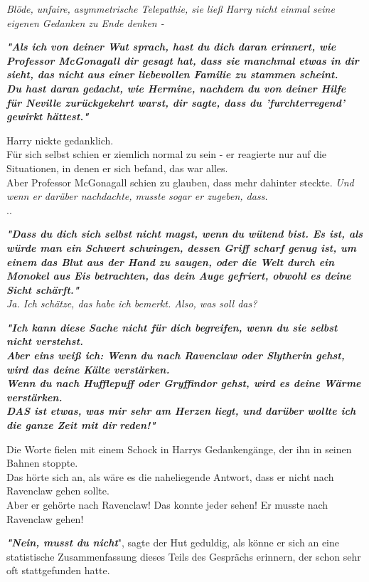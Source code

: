 {\emph{Blöde, unfaire, asymmetrische Telepathie, sie ließ Harry nicht einmal seine eigenen Gedanken zu Ende denken -}

\textbf{\emph{"Als ich von deiner Wut sprach, hast du dich daran erinnert, wie Professor McGonagall dir gesagt hat, dass sie manchmal etwas in dir sieht, das nicht aus einer liebevollen Familie zu stammen scheint.\\ Du hast daran gedacht, wie Hermine, nachdem du von deiner Hilfe für Neville zurückgekehrt warst, dir sagte, dass du 'furchterregend' gewirkt hättest."}}

Harry nickte gedanklich.\\ Für sich selbst schien er ziemlich normal zu sein - er reagierte nur auf die Situationen, in denen er sich befand, das war alles.\\ Aber Professor McGonagall schien zu glauben, dass mehr dahinter steckte. \emph{Und wenn er darüber nachdachte, musste sogar er zugeben, dass.}\\ ..

\textbf{\emph{"Dass du dich sich selbst nicht magst, wenn du wütend bist. Es ist, als würde man ein Schwert schwingen, dessen Griff scharf genug ist, um einem das Blut aus der Hand zu saugen, oder die Welt durch ein Monokel aus Eis betrachten, das dein Auge gefriert, obwohl es deine Sicht schärft."}}\\ \emph{\hfill\break Ja. Ich schätze, das habe ich bemerkt. Also, was soll das?}

\textbf{\emph{"Ich kann diese Sache nicht für dich begreifen, wenn du sie selbst nicht verstehst.\\ Aber eins weiß ich: Wenn du nach Ravenclaw oder Slytherin gehst, wird das deine Kälte verstärken.}}\\ \textbf{\emph{Wenn du nach Hufflepuff oder Gryffindor gehst, wird es deine Wärme verstärken.\\ DAS ist etwas, was mir sehr am Herzen liegt, und darüber wollte ich die ganze Zeit mit dir}} \textbf{\emph{reden!"}}

Die Worte fielen mit einem Schock in Harrys Gedankengänge, der ihn in seinen Bahnen stoppte.\\ Das hörte sich an, als wäre es die naheliegende Antwort, dass er nicht nach Ravenclaw gehen sollte.\\ Aber er gehörte nach Ravenclaw! Das konnte jeder sehen! Er musste nach Ravenclaw gehen!

\textbf{\emph{"Nein, musst du nicht}}", sagte der Hut geduldig, als könne er sich an eine statistische Zusammenfassung dieses Teils des Gesprächs erinnern, der schon sehr oft stattgefunden hatte.

}
